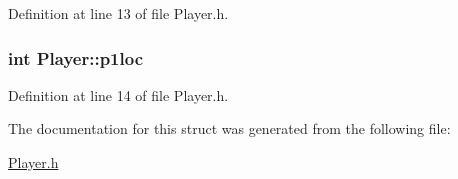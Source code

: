 Definition at line 13 of file Player.\+h.

\hypertarget{struct_player_ae52dec091d0be539c78accd4aea23646}{}
\subsubsection[{p1loc}]{\setlength{\rightskip}{0pt plus 5cm}int Player\+::p1loc}\label{struct_player_ae52dec091d0be539c78accd4aea23646}


Definition at line 14 of file Player.\+h.



The documentation for this struct was generated from the following file\+:\begin{DoxyCompactItemize}
\item 
\hyperlink{_player_8h}{Player.\+h}\end{DoxyCompactItemize}
